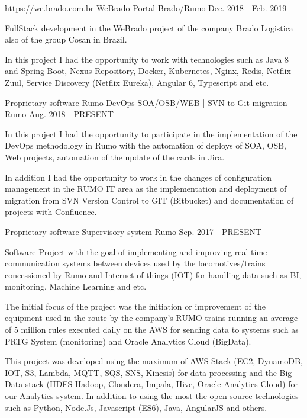 \begin{cventries}
\cventry
 {\hyperref[http://we.brado.com.br/v2]{https://we.brado.com.br}} %
{WeBrado Portal }%
{Brado/Rumo} %
{Dec. 2018 - Feb. 2019} %
{
  \begin{cvitems} %
   \item{FullStack development in the WeBrado project of the company Brado Logistica also of the group Cosan in Brazil.}
   \item{In this project I had the opportunity to work with technologies such as Java 8 and Spring Boot, Nexus Repository, Docker, Kubernetes, Nginx, Redis, Netflix Zuul, Service Discovery (Netflix Eureka), Angular 6, Typescript and etc.}
  \end{cvitems}
}

  \cventry
    {Proprietary software} %
    {Rumo DevOps SOA/OSB/WEB | SVN to Git migration }%
    {Rumo} %
    {Aug. 2018 - PRESENT} %
    {
      \begin{cvitems} %
       \item{In this project I had the opportunity to participate in the implementation of the DevOps methodology in Rumo with the automation of deploys of SOA, OSB, Web projects, automation of the update of the cards in Jira.}
       \item{In addition I had the opportunity to work in the changes of configuration management in the RUMO IT area as the implementation and deployment of migration from SVN Version Control to GIT (Bitbucket) and documentation of projects with Confluence.}
      \end{cvitems}
    }
  \cventry
    {Proprietary software} %
    {Supervisory system}%
    {Rumo} %
    {Sep. 2017 - PRESENT} %
    {
      \begin{cvitems} %
       \item{Software Project with the goal of implementing and improving real-time communication systems between devices used by the locomotives/trains concessioned by Rumo and Internet of things (IOT) for handling data such as BI, monitoring, Machine Learning and etc.}
       \item{The initial focus of the project was the initiation or improvement of the equipment used in the route by the company's RUMO trains running an average of 5 million rules executed daily on the AWS for sending data to systems such as PRTG System (monitoring) and Oracle Analytics Cloud (BigData).}
       \item{This project was developed using the maximum of AWS Stack (EC2, DynamoDB, IOT, S3, Lambda, MQTT, SQS, SNS, Kinesis) for data processing and the Big Data stack (HDFS Hadoop, Cloudera, Impala, Hive, Oracle Analytics Cloud) for our Analytics system. In addition to using the most the open-source technologies such as Python, Node.Js, Javascript (ES6), Java, AngularJS and others.}
      \end{cvitems}
    }


\end{cventries}
